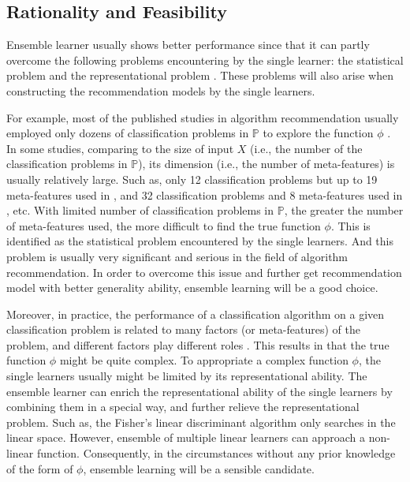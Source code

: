 \documentclass[prodmode,acmtkdd]{acmsmall}
\begin{document}
\subsection{Rationality and Feasibility}\label{subsec:rationality}

Ensemble learner usually shows better performance since that it can
partly overcome the following problems encountering by the single
learner: the statistical problem and the representational problem
\cite{dietterichl2002ensemble}. These problems will also arise when
constructing the recommendation models by the single learners.

For example, most of the published studies in algorithm
recommendation usually employed only dozens of classification
problems in $\mathbb{P}$ to explore the function $\phi$
\cite{brazdil2003ranking,king1995statlog,song2012automatic,ali2006learning,prudencio2011selecting,peng2002improved,kalousis2004data,kalousis2002algorithm,brodley1993addressing,Pfahringer00meta}.
In some studies, comparing to the size of input $X$ (i.e., the
number of the classification problems in $\mathbb{P}$), its
dimension (i.e., the number of meta-features) is usually relatively
large. Such as, only 12 classification problems but up to 19
meta-features used in \cite{king1995statlog}, and 32 classification
problems and 8 meta-features used in \cite{prudencio2011selecting},
etc. With limited number of classification problems in $\mathbb{P}$,
the greater the number of meta-features used, the more difficult to
find the true function $\phi$. This is identified as the statistical
problem encountered by the single learners. And this problem is
usually very significant and serious in the field of algorithm
recommendation. In order to overcome this issue and further get
recommendation model with better generality ability, ensemble
learning will be a good choice.

Moreover, in practice, the performance of a classification algorithm
on a given classification problem is related to many factors (or
meta-features) of the problem, and different factors play different
roles \cite{wang2014generic}. This results in that the true function
$\phi$ might be quite complex. To appropriate a complex function
$\phi$, the single learners usually might be limited by its
representational ability. The ensemble learner can enrich the
representational ability of the single learners by combining them in
a special way, and further relieve the representational problem.
Such as, the Fisher's linear discriminant algorithm only searches in
the linear space. However, ensemble of multiple linear learners can
approach a non-linear function. Consequently, in the circumstances
without any prior knowledge of the form of $\phi$, ensemble learning
will be a sensible candidate.
\end{document}
